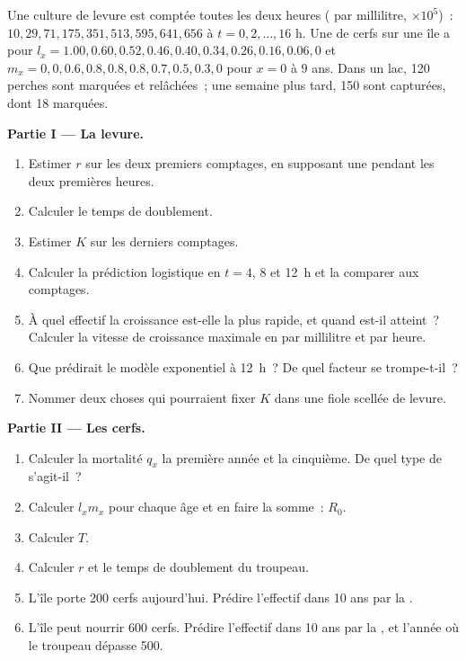 \begin{problem}
\label{pb:b1:populations:1}
Une culture de levure est comptée toutes les deux heures ( par
millilitre, $\times 10^5$)~: $10, 29, 71, 175, 351, 513, 595, 641, 656$ à $t = 0,
2, \ldots, 16$ h. Une  de cerfs sur une île a pour  $l_x = 1.00, 0.60, 0.52, 0.46, 0.40, 0.34, 0.26, 0.16, 0.06, 0$ et
$m_x = 0, 0, 0.6, 0.8, 0.8, 0.8, 0.7, 0.5, 0.3, 0$ pour $x = 0$ à $9$
ans. Dans un lac, 120 perches sont marquées et relâchées~; une semaine
plus tard, 150 sont capturées, dont 18 marquées.

\medskip
\noindent\textbf{Partie I --- La levure.}
\begin{enumerate}
  \item Estimer $r$ sur les deux premiers comptages, en supposant une
         pendant les deux premières heures.
  \item Calculer le temps de doublement.
  \item Estimer $K$ sur les derniers comptages.
  \item Calculer la prédiction logistique en $t = 4$, $8$ et \qty{12}{h}
        et la comparer aux comptages.
  \item À quel effectif la croissance est-elle la plus rapide, et quand
        est-il atteint~? Calculer la vitesse de croissance maximale en
         par millilitre et par heure.
  \item Que prédirait le modèle exponentiel à \qty{12}{h}~? De quel
        facteur se trompe-t-il~?
  \item Nommer deux choses qui pourraient fixer $K$ dans une fiole
        scellée de levure.
\end{enumerate}

\medskip
\noindent\textbf{Partie II --- Les cerfs.}
\begin{enumerate}[resume]
  \item Calculer la mortalité $q_x$ la première année et la cinquième.
        De quel type de  s'agit-il~?
  \item Calculer $l_x m_x$ pour chaque âge et en faire la somme~: $R_0$.
  \item Calculer $T$.
  \item Calculer $r$ et le temps de doublement du troupeau.
  \item L'île porte 200 cerfs aujourd'hui. Prédire l'effectif dans 10
        ans par la .
  \item L'île peut nourrir 600 cerfs. Prédire l'effectif dans 10 ans
        par la , et l'année où le troupeau
        dépasse 500.
\end{enumerate}


\end{problem}
